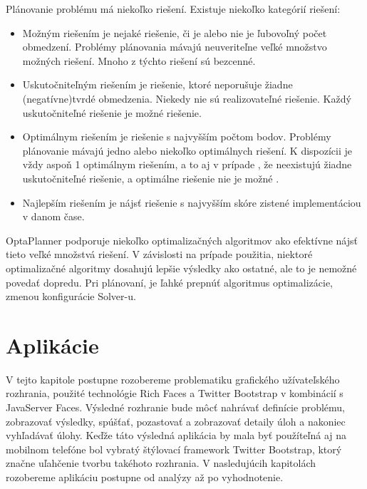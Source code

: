 Plánovanie problému má niekoľko riešení. Existuje niekoľko kategórií riešení:
\begin{itemize}
\item Možným riešením je nejaké riešenie, či je alebo nie je ľubovoľný počet obmedzení. Problémy plánovania mávajú neuveriteľne veľké množstvo možných riešení. Mnoho z týchto riešení sú bezcenné.
\item Uskutočniteľným riešením je riešenie, ktoré neporušuje žiadne (negatívne)tvrdé obmedzenia. Niekedy nie sú realizovateľné riešenie. Každý uskutočniteľné riešenie je možné riešenie.

\item Optimálnym riešením je riešenie s najvyšším počtom bodov. Problémy plánovanie mávajú jedno alebo niekoľko optimálnych riešení. K dispozícii je vždy aspoň 1 optimálnym riešením, a to aj v prípade , že neexistujú žiadne uskutočniteľné riešenie, a optimálne riešenie nie je možné .
\item Najlepším riešením je nájsť riešenie s najvyšším skóre zistené implementáciou v danom čase.

\end{itemize}

OptaPlanner podporuje niekoľko optimalizačných algoritmov ako efektívne nájsť tieto veľké množstvá riešení. V závislosti na prípade použitia, niektoré optimalizačné algoritmy dosahujú lepšie výsledky ako ostatné, ale to je nemožné povedať dopredu. Pri plánovaní, je ľahké prepnúť algoritmus optimalizácie, zmenou konfigurácie Solver-u.


\newpage


\chapter{Aplikácie}
V tejto kapitole postupne rozobereme problematiku grafického užívateľského rozhrania, použité technológie Rich Faces a Twitter Bootstrap v kombinácií s JavaServer Faces. Výsledné rozhranie bude môcť nahrávať definície problému, zobrazovať výsledky, spúšťať, pozastovať a zobrazovať detaily úloh a nakoniec vyhľadávať úlohy. Keďže táto výsledná aplikácia by mala byť použíteľná aj na mobilnom telefóne bol vybratý štýlovací framework Twitter Bootstrap, ktorý značne uľahčenie tvorbu takéhoto rozhrania. V nasledujúcih kapitolách rozobereme aplikáciu postupne od analýzy až po vyhodnotenie.

